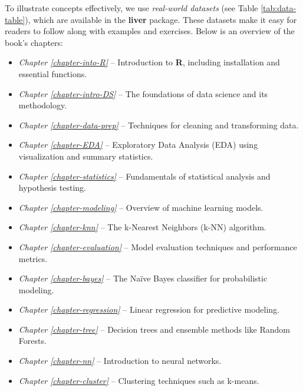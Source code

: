 \documentclass[
]{book}
\providecommand{\tightlist}{%
  \setlength{\itemsep}{0pt}\setlength{\parskip}{0pt}}
\theoremstyle{definition}
\theoremstyle{definition}
\theoremstyle{definition}
\theoremstyle{definition}
\theoremstyle{remark}
\begin{document}
To illustrate concepts effectively, we use \emph{real-world datasets} (see Table \ref{tab:data-table}), which are available in the \textbf{liver} package. These datasets make it easy for readers to follow along with examples and exercises. Below is an overview of the book's chapters:

\begin{itemize}
\tightlist
\item
  \emph{Chapter \ref{chapter-into-R}} -- Introduction to \textbf{R}, including installation and essential functions.\\
\item
  \emph{Chapter \ref{chapter-intro-DS}} -- The foundations of data science and its methodology.\\
\item
  \emph{Chapter \ref{chapter-data-prep}} -- Techniques for cleaning and transforming data.\\
\item
  \emph{Chapter \ref{chapter-EDA}} -- Exploratory Data Analysis (EDA) using visualization and summary statistics.\\
\item
  \emph{Chapter \ref{chapter-statistics}} -- Fundamentals of statistical analysis and hypothesis testing.\\
\item
  \emph{Chapter \ref{chapter-modeling}} -- Overview of machine learning models.\\
\item
  \emph{Chapter \ref{chapter-knn}} -- The k-Nearest Neighbors (k-NN) algorithm.\\
\item
  \emph{Chapter \ref{chapter-evaluation}} -- Model evaluation techniques and performance metrics.\\
\item
  \emph{Chapter \ref{chapter-bayes}} -- The Naïve Bayes classifier for probabilistic modeling.\\
\item
  \emph{Chapter \ref{chapter-regression}} -- Linear regression for predictive modeling.\\
\item
  \emph{Chapter \ref{chapter-tree}} -- Decision trees and ensemble methods like Random Forests.\\
\item
  \emph{Chapter \ref{chapter-nn}} -- Introduction to neural networks.\\
\item
  \emph{Chapter \ref{chapter-cluster}} -- Clustering techniques such as k-means.
\end{itemize}
\end{document}
